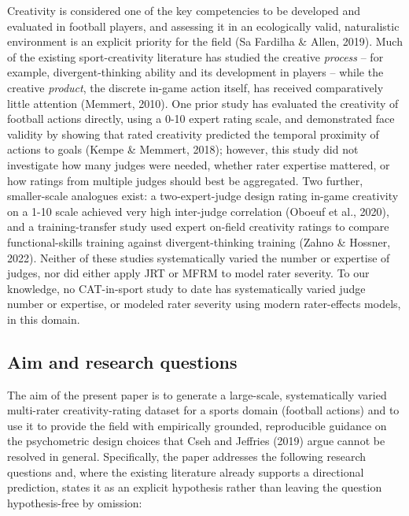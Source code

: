 \documentclass[
  12pt,
]{article}
\begin{document}
Creativity is considered one of the key competencies to be developed and
evaluated in football players, and assessing it in an ecologically
valid, naturalistic environment is an explicit priority for the field
(Sa Fardilha \& Allen, 2019). Much of the existing sport-creativity
literature has studied the creative \emph{process} -- for example,
divergent-thinking ability and its development in players -- while the
creative \emph{product}, the discrete in-game action itself, has
received comparatively little attention (Memmert, 2010). One prior study
has evaluated the creativity of football actions directly, using a 0-10
expert rating scale, and demonstrated face validity by showing that
rated creativity predicted the temporal proximity of actions to goals
(Kempe \& Memmert, 2018); however, this study did not investigate how
many judges were needed, whether rater expertise mattered, or how
ratings from multiple judges should best be aggregated. Two further,
smaller-scale analogues exist: a two-expert-judge design rating in-game
creativity on a 1-10 scale achieved very high inter-judge correlation
(Oboeuf et al., 2020), and a training-transfer study used expert
on-field creativity ratings to compare functional-skills training
against divergent-thinking training (Zahno \& Hossner, 2022). Neither of
these studies systematically varied the number or expertise of judges,
nor did either apply JRT or MFRM to model rater severity. To our
knowledge, no CAT-in-sport study to date has systematically varied judge
number or expertise, or modeled rater severity using modern
rater-effects models, in this domain.

\subsection{Aim and research
questions}\label{aim-and-research-questions}

The aim of the present paper is to generate a large-scale,
systematically varied multi-rater creativity-rating dataset for a sports
domain (football actions) and to use it to provide the field with
empirically grounded, reproducible guidance on the psychometric design
choices that Cseh and Jeffries (2019) argue cannot be resolved in
general. Specifically, the paper addresses the following research
questions and, where the existing literature already supports a
directional prediction, states it as an explicit hypothesis rather than
leaving the question hypothesis-free by omission:
\end{document}
